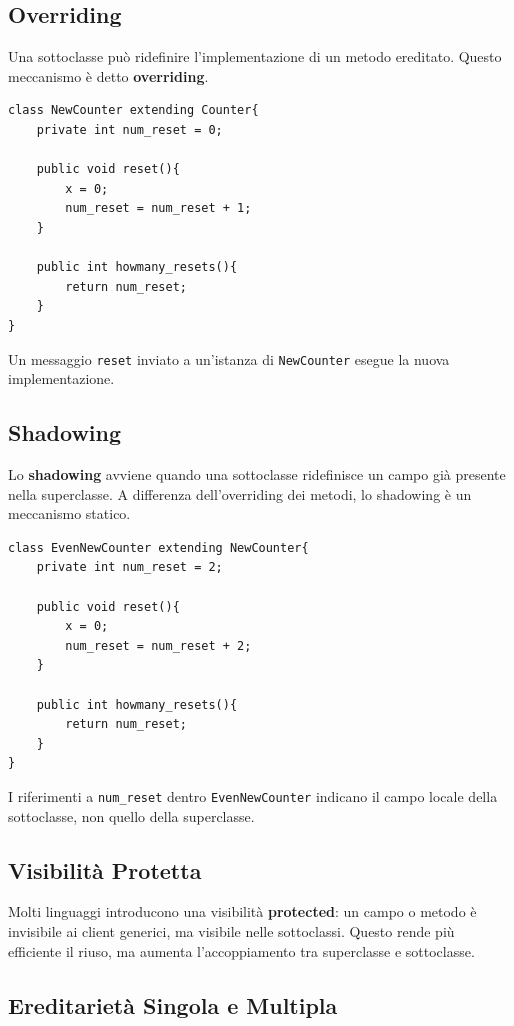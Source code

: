 \documentclass{article}
\begin{document}
\subsection{Overriding}

Una sottoclasse può ridefinire l'implementazione di un metodo ereditato. Questo meccanismo è detto \textbf{overriding}.

\begin{lstlisting}
class NewCounter extending Counter{
    private int num_reset = 0;

    public void reset(){
        x = 0;
        num_reset = num_reset + 1;
    }

    public int howmany_resets(){
        return num_reset;
    }
}
\end{lstlisting}

Un messaggio \texttt{reset} inviato a un'istanza di \texttt{NewCounter} esegue la nuova implementazione.

\subsection{Shadowing}

Lo \textbf{shadowing} avviene quando una sottoclasse ridefinisce un campo già presente nella superclasse. A differenza dell'overriding dei metodi, lo shadowing è un meccanismo statico.

\begin{lstlisting}
class EvenNewCounter extending NewCounter{
    private int num_reset = 2;

    public void reset(){
        x = 0;
        num_reset = num_reset + 2;
    }

    public int howmany_resets(){
        return num_reset;
    }
}
\end{lstlisting}

I riferimenti a \texttt{num\_reset} dentro \texttt{EvenNewCounter} indicano il campo locale della sottoclasse, non quello della superclasse.

\subsection{Visibilità Protetta}

Molti linguaggi introducono una visibilità \textbf{protected}: un campo o metodo è invisibile ai client generici, ma visibile nelle sottoclassi. Questo rende più efficiente il riuso, ma aumenta l'accoppiamento tra superclasse e sottoclasse.

\subsection{Ereditarietà Singola e Multipla}
\end{document}
